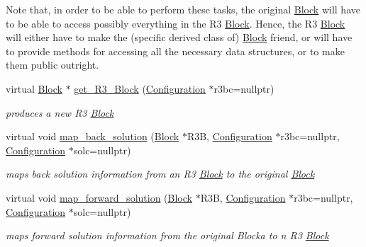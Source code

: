 \begin{Indent}
{Note that, in order to be able to perform these tasks, the original \mbox{\hyperlink{class_s_m_spp__di__unipi__it_1_1_block}{Block}} will have to be able to access possibly everything in the R3 \mbox{\hyperlink{class_s_m_spp__di__unipi__it_1_1_block}{Block}}. Hence, the R3 \mbox{\hyperlink{class_s_m_spp__di__unipi__it_1_1_block}{Block}} will either have to make the (specific derived class of) \mbox{\hyperlink{class_s_m_spp__di__unipi__it_1_1_block}{Block}} friend, or will have to provide methods for accessing all the necessary data structures, or to make them public outright. }\begin{DoxyCompactItemize}
\item 
virtual \mbox{\hyperlink{class_s_m_spp__di__unipi__it_1_1_block}{Block}} $\ast$ \mbox{\hyperlink{class_s_m_spp__di__unipi__it_1_1_block_a2e682f5c0d4a74503c0cb5ab38fb6428}{get\+\_\+\+R3\+\_\+\+Block}} (\mbox{\hyperlink{class_s_m_spp__di__unipi__it_1_1_configuration}{Configuration}} $\ast$r3bc=nullptr)
\begin{DoxyCompactList}\small\item\em produces a new R3 \mbox{\hyperlink{class_s_m_spp__di__unipi__it_1_1_block}{Block}} \end{DoxyCompactList}\item 
virtual void \mbox{\hyperlink{class_s_m_spp__di__unipi__it_1_1_block_a04f0a8a608fcc3ded227c2552f67f1a3}{map\+\_\+back\+\_\+solution}} (\mbox{\hyperlink{class_s_m_spp__di__unipi__it_1_1_block}{Block}} $\ast$R3B, \mbox{\hyperlink{class_s_m_spp__di__unipi__it_1_1_configuration}{Configuration}} $\ast$r3bc=nullptr, \mbox{\hyperlink{class_s_m_spp__di__unipi__it_1_1_configuration}{Configuration}} $\ast$solc=nullptr)
\begin{DoxyCompactList}\small\item\em maps back solution information from an R3 \mbox{\hyperlink{class_s_m_spp__di__unipi__it_1_1_block}{Block}} to the original \mbox{\hyperlink{class_s_m_spp__di__unipi__it_1_1_block}{Block}} \end{DoxyCompactList}\item 
virtual void \mbox{\hyperlink{class_s_m_spp__di__unipi__it_1_1_block_a7759467d70613a10c1cdb5d3193b4434}{map\+\_\+forward\+\_\+solution}} (\mbox{\hyperlink{class_s_m_spp__di__unipi__it_1_1_block}{Block}} $\ast$R3B, \mbox{\hyperlink{class_s_m_spp__di__unipi__it_1_1_configuration}{Configuration}} $\ast$r3bc=nullptr, \mbox{\hyperlink{class_s_m_spp__di__unipi__it_1_1_configuration}{Configuration}} $\ast$solc=nullptr)
\begin{DoxyCompactList}\small\item\em maps forward solution information from the original Blocka to n R3 \mbox{\hyperlink{class_s_m_spp__di__unipi__it_1_1_block}{Block}} \end{DoxyCompactList}\item 

\end{DoxyCompactItemize}
\end{Indent}
